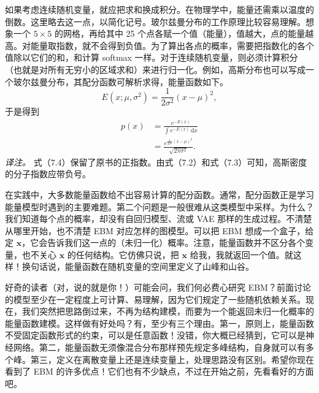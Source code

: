 如果考虑连续随机变量，就应把求和换成积分。在物理学中，能量还需乘以温度的倒数。这里略去这一点，以简化记号。玻尔兹曼分布的工作原理比较容易理解。想象一个 $5\times5$ 的网格，再给其中 25 个点各赋一个值（能量），值越大，点的能量越高。对能量取指数，就不会得到负值。为了算出各点的概率，需要把指数化的各个值除以它们的和，和计算 softmax 一样。对于连续随机变量，则必须计算积分（也就是对所有无穷小的区域求和）来进行归一化。例如，高斯分布也可以写成一个玻尔兹曼分布，其配分函数可解析求得，能量函数如下。
\begin{equation}
E(x;\mu,\sigma^2)=\frac{1}{2\sigma^2}(x-\mu)^2,
\tag{7.2}\label{eq:07-02}
\end{equation}
于是得到
\begin{align}
p(x)&=\frac{e^{-E(x)}}{\int e^{-E(x)}\,\mathrm{d}x}
              \tag{7.3}\label{eq:07-03}\\
    &=\frac{e^{\frac{1}{2\sigma^2}(x-\mu)^2}}{\sqrt{2\pi\sigma^2}}.
              \tag{7.4}\label{eq:07-04}
\end{align}
\emph{译注。} 式（7.4）保留了原书的正指数。由式（7.2）和式（7.3）可知，高斯密度的分子指数应带负号。

在实践中，大多数能量函数给不出容易计算的配分函数。通常，配分函数正是学习能量模型时遇到的主要难题。第二个问题是一般很难从这类模型中采样。为什么？我们知道每个点的概率，却没有自回归模型、流或 VAE 那样的生成过程。不清楚从哪里开始，也不清楚 EBM 对应怎样的图模型。可以把 EBM 想成一个盒子，给定 $\mathbf{x}$，它会告诉我们这一点的（未归一化）概率。注意，能量函数并不区分各个变量，也不关心 $\mathbf{x}$ 的任何结构。它仿佛只说，把 $\mathbf{x}$ 给我，我就返回一个值。就这样！换句话说，能量函数在随机变量的空间里定义了山峰和山谷。

好奇的读者（对，说的就是你！）可能会问，我们何必费心研究 EBM？前面讨论的模型至少在一定程度上可计算、易理解，因为它们规定了一些随机依赖关系。现在，我们突然把思路倒过来，不再为结构建模，而要为一个能返回未归一化概率的能量函数建模。这样做有好处吗？有，至少有三个理由。第一，原则上，能量函数不受固定函数形式的约束，可以是任意函数！没错，你大概已经猜到，它可以是神经网络。第二，能量函数无须像混合分布那样预先规定多峰结构，自身就可以有多个峰。第三，定义在离散变量上还是连续变量上，处理思路没有区别。希望你现在看到了 EBM 的许多优点！它们也有不少缺点，不过在开始之前，先看看好的方面吧。

